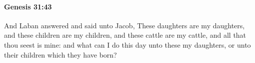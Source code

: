 
		\paragraph{Genesis 31:43} %
			\label{GENESIS-31-43}

			And Laban answered and said unto Jacob, These daughters are my daughters, and these children are my children, and these cattle are my cattle, and all that thou seest is mine: and what can I do this day unto these my daughters, or unto their children which they have born?


